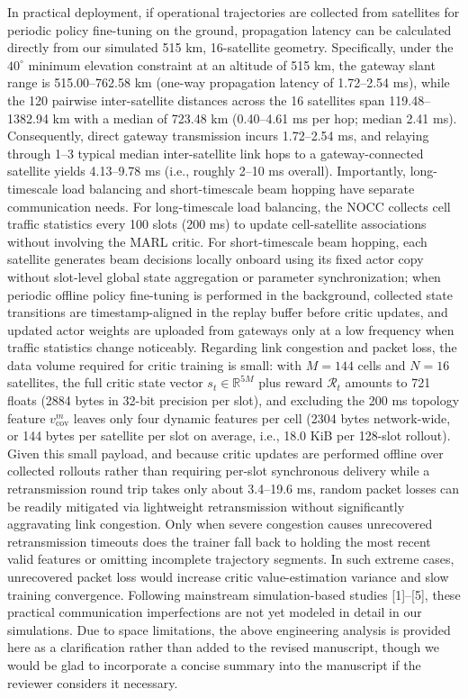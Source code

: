 \documentclass[11pt,a4paper]{article}
\begin{document}
In practical deployment, if operational trajectories are collected from satellites for periodic policy fine-tuning on the ground, propagation latency can be calculated directly from our simulated 515 km, 16-satellite geometry. Specifically, under the $40^\circ$ minimum elevation constraint at an altitude of 515 km, the gateway slant range is 515.00--762.58 km (one-way propagation latency of 1.72--2.54 ms), while the 120 pairwise inter-satellite distances across the 16 satellites span 119.48--1382.94 km with a median of 723.48 km (0.40--4.61 ms per hop; median 2.41 ms). Consequently, direct gateway transmission incurs 1.72--2.54 ms, and relaying through 1--3 typical median inter-satellite link hops to a gateway-connected satellite yields 4.13--9.78 ms (i.e., roughly 2--10 ms overall). Importantly, long-timescale load balancing and short-timescale beam hopping have separate communication needs. For long-timescale load balancing, the NOCC collects cell traffic statistics every 100 slots (200 ms) to update cell-satellite associations without involving the MARL critic. For short-timescale beam hopping, each satellite generates beam decisions locally onboard using its fixed actor copy without slot-level global state aggregation or parameter synchronization; when periodic offline policy fine-tuning is performed in the background, collected state transitions are timestamp-aligned in the replay buffer before critic updates, and updated actor weights are uploaded from gateways only at a low frequency when traffic statistics change noticeably. Regarding link congestion and packet loss, the data volume required for critic training is small: with $M=144$ cells and $N=16$ satellites, the full critic state vector $s_t\in\mathbb{R}^{5M}$ plus reward $\mathcal{R}_t$ amounts to 721 floats (2884 bytes in 32-bit precision per slot), and excluding the 200 ms topology feature $v_{\mathrm{cov}}^m$ leaves only four dynamic features per cell (2304 bytes network-wide, or 144 bytes per satellite per slot on average, i.e., 18.0 KiB per 128-slot rollout). Given this small payload, and because critic updates are performed offline over collected rollouts rather than requiring per-slot synchronous delivery while a retransmission round trip takes only about 3.4--19.6 ms, random packet losses can be readily mitigated via lightweight retransmission without significantly aggravating link congestion. Only when severe congestion causes unrecovered retransmission timeouts does the trainer fall back to holding the most recent valid features or omitting incomplete trajectory segments. In such extreme cases, unrecovered packet loss would increase critic value-estimation variance and slow training convergence. Following mainstream simulation-based studies [1]--[5], these practical communication imperfections are not yet modeled in detail in our simulations. Due to space limitations, the above engineering analysis is provided here as a clarification rather than added to the revised manuscript, though we would be glad to incorporate a concise summary into the manuscript if the reviewer considers it necessary.
\par
\end{document}
